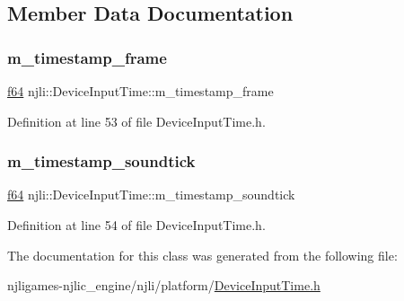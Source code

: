 \subsection{Member Data Documentation}
\mbox{\label{classnjli_1_1_device_input_time_a798d29d739522cad83bd37986ed15a20}} 
\subsubsection{\texorpdfstring{m\+\_\+timestamp\+\_\+frame}{m\_timestamp\_frame}}
{\footnotesize\ttfamily \mbox{\hyperlink{_util_8h_a94dab5770726ccbef8c7d026cfbdf8e5}{f64}} njli\+::\+Device\+Input\+Time\+::m\+\_\+timestamp\+\_\+frame\hspace{0.3cm}{\ttfamily [private]}}



Definition at line 53 of file Device\+Input\+Time.\+h.

\mbox{\label{classnjli_1_1_device_input_time_a20e05f326dd3a3836a549cba6b536e85}} 
\subsubsection{\texorpdfstring{m\+\_\+timestamp\+\_\+soundtick}{m\_timestamp\_soundtick}}
{\footnotesize\ttfamily \mbox{\hyperlink{_util_8h_a94dab5770726ccbef8c7d026cfbdf8e5}{f64}} njli\+::\+Device\+Input\+Time\+::m\+\_\+timestamp\+\_\+soundtick\hspace{0.3cm}{\ttfamily [private]}}



Definition at line 54 of file Device\+Input\+Time.\+h.



The documentation for this class was generated from the following file\+:\begin{DoxyCompactItemize}
\item 
njligames-\/njlic\+\_\+engine/njli/platform/\mbox{\hyperlink{_device_input_time_8h}{Device\+Input\+Time.\+h}}\end{DoxyCompactItemize}
